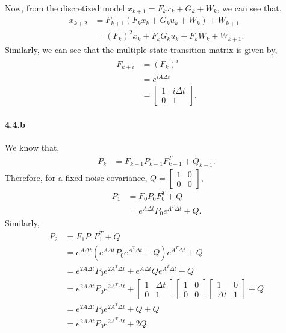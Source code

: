 Now, from the discretized model $x_{k+1}=F_k x_k+G_k+W_k$, we can see that,
\begin{align*}
	x_{k+2} &= F_{k+1}\left(F_k x_k+G_ku_k+W_k\right)+W_{k+1}\\
	&= (F_k)^2x_k + F_kG_ku_k + F_kW_k + W_{k+1}.
\end{align*}
Similarly, we can see that the multiple state transition matrix is given by,
\begin{align*}
	F_{k+i} &= (F_k)^i\\
	&= e^{iA\Delta t}\\
	&= \begin{bmatrix}1&i\Delta t\\0&1\end{bmatrix}.
\end{align*}
\paragraph{4.4.b}We know that,
\begin{align*}
	P_k &= F_{k-1}P_{k-1}F_{k-1}^T+Q_{k-1}.
\end{align*}
Therefore, for a fixed noise covariance, $Q = \begin{bmatrix}1&0\\0&0\end{bmatrix}$,
\begin{align*}
	P_1 &= F_0 P_0 F_0^T+Q\\
	&= e^{A\Delta t}P_0 e^{A^T\Delta t}+Q.
\end{align*}
Similarly,
\begin{align*}
	P_2 &= F_1P_1F_1^T+Q\\
	&= e^{A\Delta t}\left(e^{A\Delta t}P_0 e^{A^T\Delta t}+Q\right)e^{A^T\Delta t}+Q\\
	&= e^{2A\Delta t}P_0e^{2A^T\Delta t} + e^{A\Delta t}Qe^{A^T\Delta t}+Q\\
	&= e^{2A\Delta t}P_0e^{2A^T\Delta t} + \begin{bmatrix}1 &\Delta t\\0&1\end{bmatrix}\begin{bmatrix}1&0\\0&0\end{bmatrix}\begin{bmatrix}1&0\\\Delta t&1\end{bmatrix}+Q\\
	&= e^{2A\Delta t}P_0e^{2A^T\Delta t} + Q + Q\\
	&= e^{2A\Delta t}P_0e^{2A^T\Delta t} + 2Q.
\end{align*}
